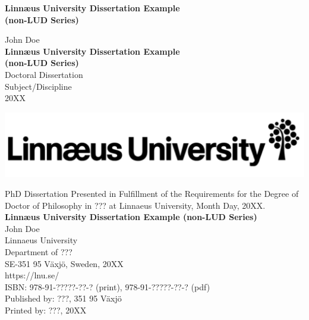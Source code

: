 \begin{center}
\null\vspace{4.5cm}
{ \Large \bfseries Linn{\ae}us University Dissertation Example\\[0.3cm](non-LUD Series)}%
\end{center}

\draftstamp

\cleardoublepage

\begin{center}

\null\vspace{4.5cm}
\normalsize   John Doe\\[1.5cm]
{ \Large \bfseries Linn{\ae}us University Dissertation Example\\[0.3cm](non-LUD Series)}%
\\[2cm]

Doctoral Dissertation\\[0.2cm]
Subject/Discipline\\[0.4cm]
20XX
\vfill

\draftstamp

\includegraphics[scale=0.2]{images/lnu.pdf}%

\end{center}

\clearpage

\null
\vfill
\begin{flushleft} 
{\small PhD Dissertation Presented in Fulfillment of the Requirements for the Degree of Doctor of Philosophy in ??? at Linnaeus University, Month Day, 20XX.\\[0.6cm]
\textbf{Linn{\ae}us University Dissertation Example (non-LUD Series)}
\\[0.6cm]
John Doe\\[0.6cm]
Linnaeus University\\[0.1cm]
Department of ???\\[0.1cm]
SE-351 95 V\"axj\"o, Sweden, 20XX\\[0.1cm]
https://lnu.se/\\[0.6cm]
ISBN: 978-91-?????-??-? (print), 978-91-?????-??-? (pdf)\\[0.1cm]
Published by: ???, 351 95 V\"axj\"o\\[0.1cm]
Printed by: ???, 20XX}
\end{flushleft}

\draftstamp

\cleardoublepage
